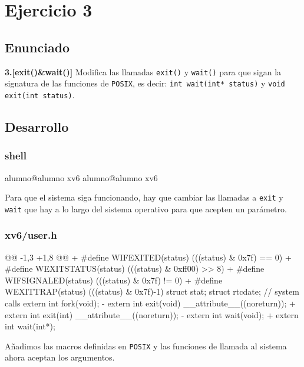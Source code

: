 \section{Ejercicio 3}
\subsection{Enunciado}
\begin{ejer}
    \textbf{3.[exit()\&wait()]} Modifica las llamadas \texttt{exit()} y \texttt{wait()} para que sigan la signatura de las
    funciones de \texttt{POSIX}, es decir: \texttt{int wait(int* status)} y \texttt{void exit(int status)}.
\end{ejer}
\subsection{Desarrollo}

\subsubsection{shell}
\begin{listing}[style=consola]
alumno@alumno xv6 %
alumno@alumno xv6 %
\end{listing}
\par Para que el sistema siga funcionando, hay que cambiar las llamadas a \texttt{exit} 
y \texttt{wait} que hay a lo largo del sistema operativo para que acepten un parámetro.

\subsubsection{xv6/user.h}
\begin{listing}
@@ -1,3 +1,8 @@
+   #define WIFEXITED(status)   (((status) & 0x7f) == 0)
+   #define WEXITSTATUS(status) (((status) & 0xff00) >> 8)
+   #define WIFSIGNALED(status) (((status) & 0x7f) != 0)
+   #define WEXITTRAP(status)   (((status) & 0x7f)-1)
    struct stat;
    struct rtcdate;
// system calls
    extern int fork(void);
-   extern int exit(void) __attribute__((noreturn));
+   extern int exit(int) __attribute__((noreturn));
-   extern int wait(void);
+   extern int wait(int*);
\end{listing}
\par Añadimos las macros definidas en \texttt{POSIX} y las funciones 
de llamada al sistema ahora aceptan los argumentos.

